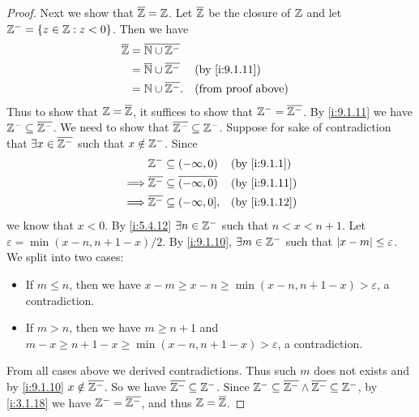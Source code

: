 \begin{proof}
  Next we show that \(\overline{\mathbb{Z}} = \mathbb{Z}\).
  Let \(\overline{\mathbb{Z}}\) be the closure of \(\mathbb{Z}\) and let \(\mathbb{Z}^- = \left\lbrace z \in \mathbb{Z} : z < 0\right\rbrace\).
  Then we have
  \begin{align*}
    \overline{\Z} & = \overline{\N \cup \Z^-}                                           \\
                  & = \overline{\N} \cup \overline{\Z^-} &  & \by{i:9.1.11}             \\
                  & = \N \cup \overline{\Z^-}.           &  & \text{(from proof above)}
  \end{align*}
  Thus to show that \(\mathbb{Z} = \overline{\mathbb{Z}}\), it suffices to show that \(\mathbb{Z}^- = \overline{\mathbb{Z}^-}\).
  By \cref{i:9.1.11} we have \(\mathbb{Z}^- \subseteq \overline{\mathbb{Z}^-}\).
  We need to show that \(\overline{\mathbb{Z}^-} \subseteq \mathbb{Z}^-\).
  Suppose for sake of contradiction that \(\exists x \in \overline{\mathbb{Z}^-}\) such that \(x \notin \mathbb{Z}^-\).
  Since
  \begin{align*}
             & \Z^- \subseteq (-\infty, 0)                       &  & \by{i:9.1.1}  \\
    \implies & \overline{\Z^-} \subseteq \overline{(-\infty, 0)} &  & \by{i:9.1.11} \\
    \implies & \overline{\Z^-} \subseteq (-\infty, 0],           &  & \by{i:9.1.12}
  \end{align*}
  we know that \(x < 0\).
  By \cref{i:5.4.12} \(\exists n \in \mathbb{Z}^-\) such that \(n < x < n + 1\).
  Let \(\varepsilon = \min(x - n, n + 1 - x) / 2\).
  By \cref{i:9.1.10}, \(\exists m \in \mathbb{Z}^-\) such that \(\left\lvert x - m\right\rvert \leq \varepsilon\).
  We split into two cases:
  \begin{itemize}
    \item If \(m \leq n\), then we have \(x - m \geq x - n \geq \min(x - n, n + 1 - x) > \varepsilon\), a contradiction.
    \item If \(m > n\), then we have \(m \geq n + 1\) and \(m - x \geq n + 1 - x \geq \min(x - n, n + 1 - x) > \varepsilon\), a contradiction.
  \end{itemize}
  From all cases above we derived contradictions.
  Thus such \(m\) does not exists and by \cref{i:9.1.10} \(x \notin \overline{\mathbb{Z}^-}\).
  So we have \(\overline{\mathbb{Z}^-} \subseteq \mathbb{Z}^-\).
  Since \(\mathbb{Z}^- \subseteq \overline{\mathbb{Z}^-} \land \overline{\mathbb{Z}^-} \subseteq \mathbb{Z}^-\), by \cref{i:3.1.18} we have \(\mathbb{Z}^- = \overline{\mathbb{Z}^-}\), and thus \(\mathbb{Z} = \overline{\mathbb{Z}}\).


\end{proof}
